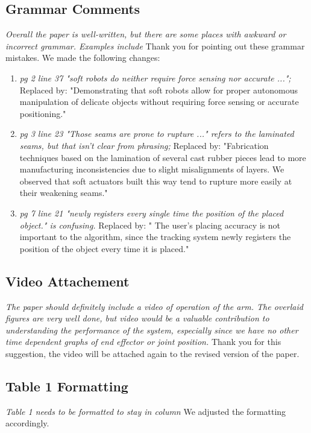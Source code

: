 \documentclass[letterpaper, 10 pt, twocolumn, conference]{article}
\begin{document}
\subsection{Grammar Comments}
\textit{Overall the paper is well-written, but there are some places with awkward or incorrect grammar. 
Examples include}
Thank you for pointing out these grammar mistakes. We made the following changes:
\begin{enumerate}
\item \textit{pg 2 line 37 "soft robots do neither require force sensing nor accurate ...";}
%
Replaced by: "Demonstrating that soft robots allow for proper autonomous manipulation of delicate objects without requiring force sensing or accurate positioning."
%
\item \textit{pg 3 line 23 "Those seams are prone to rupture ..." refers to the laminated seams, but that isn't clear from phrasing;}
%
Replaced by: "Fabrication techniques based on the lamination of several cast rubber pieces lead to more manufacturing inconsistencies due to slight misalignments of layers. 
We observed that soft actuators built this way tend to rupture more easily at their weakening seams."
%
\item \textit{pg 7 line 21 "newly registers every single time the position of the placed object." is confusing.}
%
Replaced by: " The user's placing accuracy is not important to the algorithm, since the tracking system newly registers the position of the object every time it is placed."
%
\end{enumerate}
%
\subsection{Video Attachement}
\textit{The paper should definitely include a video of operation of the arm. The overlaid figures are very well done, but video would be a valuable contribution to understanding the performance of the system, especially since we have no other time dependent graphs of end effector or joint position.}
%
Thank you for this suggestion, the video will be attached again to the revised version of the paper.
%
\subsection{Table 1 Formatting}
\textit{Table 1 needs to be formatted to stay in column}
%
We adjusted the formatting accordingly.
%
\end{document}
